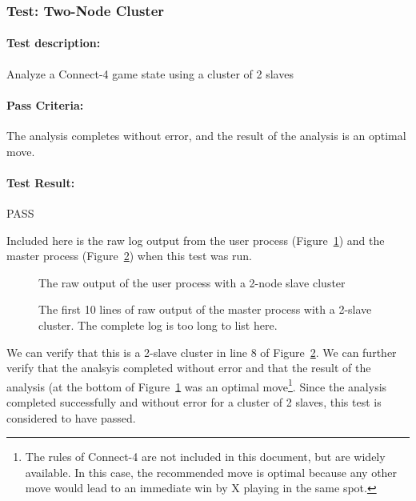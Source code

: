 \documentclass[pdftex,12pt,a4paper]{article}
\begin{document}
\subsubsection{\textbf{Test:} Two-Node Cluster}

\paragraph{Test description:} Analyze a Connect-4 game state using a cluster of 2 slaves

\paragraph{Pass Criteria:} The analysis completes without error, and the result of the analysis is an optimal move.

\paragraph{Test Result:} PASS

Included here is the raw log output from the user process (Figure~\ref{fig:duo-user-3}) and the master process (Figure~\ref{fig:duo-master-3}) when this test was run. 

\begin{figure}[h]

\caption{The raw output of the user process with a 2-node slave cluster}
\label{fig:duo-user-3}
\end{figure}

\begin{figure}[h]

\caption{The first 10 lines of raw output of the master process with a 2-slave cluster. The complete log is too long to list here.}
\label{fig:duo-master-3}
\end{figure}

We can verify that this is a 2-slave cluster in line 8 of Figure~\ref{fig:duo-master-3}. We can further verify that the analsyis completed without error and that the result of the analysis (at the bottom of Figure~\ref{fig:duo-user-3} was an optimal move\footnote{The rules of Connect-4 are not included in this document, but are widely available. In this case, the recommended move is optimal because any other move would lead to an immediate win by X playing in the same spot.}. Since the analysis completed successfully and without error for a cluster of 2 slaves, this test is considered to have passed.
\end{document}
